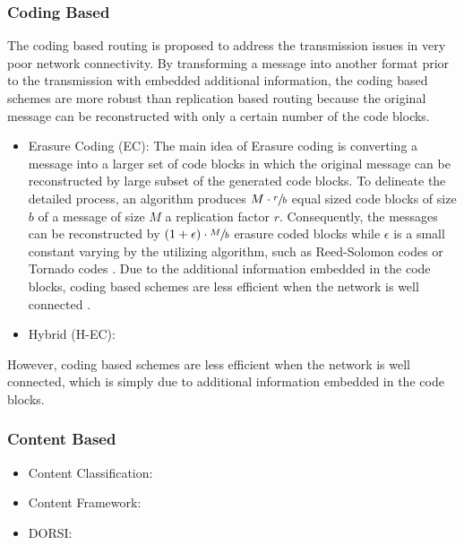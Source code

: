 \subsubsection{Coding Based }
\label{bg:Opportunistic Networks:Classification of Opportunistic Routing:CB}
The coding based routing is proposed to address the transmission issues in very poor network connectivity.
By transforming a message into another format prior to the transmission with embedded additional information, the coding based schemes are more robust than replication based routing because the original message can be reconstructed with only a certain number of the code blocks.
	\begin{itemize}
		\item Erasure Coding (EC):
		The main idea of Erasure coding \cite{Wang2005} is converting a message into a larger set of code blocks in which the original message can be reconstructed by large subset of the generated code blocks.
		To delineate the detailed process, an algorithm produces $ M \cdot \sfrac{r}{b}$ equal sized code blocks of size $b$ of	a message of size $M$ a replication factor $r$.
		Consequently, the messages can be reconstructed by  $(1+\epsilon) \cdot \sfrac{M}{b}$ erasure coded blocks while $\epsilon$ is a small constant 
		varying by the utilizing algorithm, such as Reed-Solomon codes or Tornado codes \cite{Chung2003}.
		Due to the additional information embedded in the code blocks, coding based schemes are less efficient when the network is well connected \cite{Yu2006}.



		\item Hybrid (H-EC):
	\end{itemize}


However, coding based schemes are less efficient when the network is well connected, which is simply due to additional information embedded in the code blocks.

\subsubsection{Content Based }
\label{bg:Opportunistic Networks:Classification of Opportunistic Routing:CTB}
	\begin{itemize}
		\item Content Classification:
		\item Content Framework:
		\item DORSI:
	\end{itemize}

